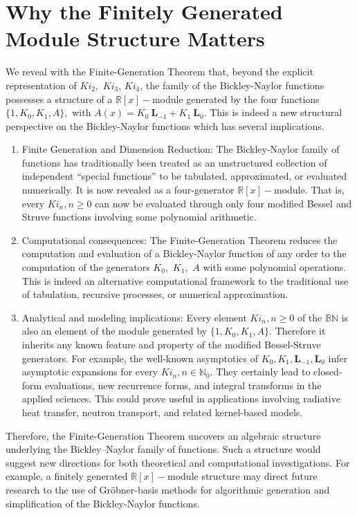 \documentclass[pdflatex,sn-mathphys-num]{sn-jnl}%
\theoremstyle{thmstyleone}%
\theoremstyle{thmstyletwo}%
\theoremstyle{thmstylethree}%
\begin{document}
\section{Why the Finitely Generated Module Structure Matters}

We reveal with the Finite-Generation Theorem that, beyond the explicit representation of $ Ki_2,$ $Ki_3$, $Ki_4$, the family of the Bickley-Naylor functions possesses a structure of a  $\mathbb{R}[x]-$module generated by the four functions $\{1, K_0, K_1, A\},$ with $A(x)=K_0 \:\pmb{L}_{-1} + K_1 \:\pmb{L}_0$. This is indeed a new structural perspective on the Bickley-Naylor functions which has several implications.

\begin{enumerate}
    \item Finite Generation and Dimension Reduction: The Bickley-Naylor family of functions has traditionally been treated as an unstructured collection of independent ``special functions'' to be tabulated, approximated, or evaluated numerically. It is now revealed as a four-generator $\mathbb{R}[x]-$module. That is, every $Ki_n, n\ge 0$ can now be evaluated through only four modified Bessel and Struve functions involving some polynomial arithmetic.
    \item Computational consequences: The Finite-Generation Theorem reduces the computation and evaluation of a Bickley-Naylor function of any order to the computation of the generators $K_0,$ $K_1,$ $A$ with some polynomial operations. This is indeed an alternative computational framework to the traditional use of tabulation, recursive processes, or numerical approximation.
    
    \item Analytical and modeling implications: Every element $Ki_n, n\ge 0$ of the $\mathbb{BN}$ is also an element of the module generated by $\{1,K_0,K_1,A\}.$ Therefore it inherits any known feature and property of the modified Bessel-Struve generators. For example, the well-known asymptotics of $K_0,K_1, \pmb{L}_{-1}, \pmb{L}_0$ infer asymptotic expansions for every $Ki_n,n\in\mathbb{N}_0.$ They certainly lead to closed-form evaluations, new recurrence forms, and integral transforms in the applied sciences. This could prove useful in applications involving radiative heat transfer, neutron transport, and related kernel-based models.
\end{enumerate}

Therefore, the Finite-Generation Theorem uncovers an algebraic structure underlying the Bickley–Naylor family of functions. Such a structure would suggest new directions for both theoretical and computational investigations. For example, a finitely generated $\mathbb{R}[x]-$module structure may direct future research to the use of Gr\"obner-basis methods for algorithmic generation and simplification of the Bickley-Naylor functions.
 
\end{document}
